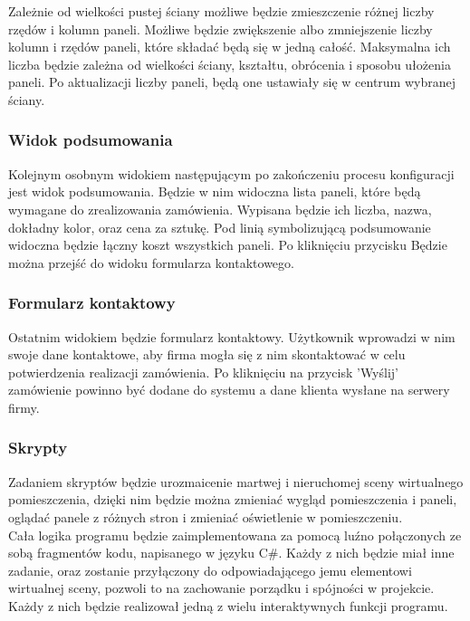 \documentclass{article} %
\begin{document}
        Zależnie od wielkości pustej ściany możliwe będzie zmieszczenie różnej liczby rzędów i kolumn paneli. Możliwe będzie zwiększenie albo zmniejszenie liczby kolumn i rzędów paneli, które składać będą się w jedną całość. Maksymalna ich liczba będzie zależna od wielkości ściany, kształtu, obrócenia i sposobu ułożenia paneli. Po aktualizacji liczby paneli, będą one ustawiały się w centrum wybranej ściany.
        \\
        
        \subsubsection*{Widok podsumowania}
        Kolejnym osobnym widokiem następującym po zakończeniu procesu konfiguracji jest widok podsumowania. Będzie w nim widoczna lista paneli, które będą wymagane do zrealizowania zamówienia. Wypisana będzie ich liczba, nazwa, dokładny kolor, oraz cena za sztukę. Pod linią symbolizującą podsumowanie widoczna będzie łączny koszt wszystkich paneli. Po kliknięciu przycisku Będzie można przejść do widoku formularza kontaktowego.
        \\
        
        \subsubsection*{Formularz kontaktowy}
        Ostatnim widokiem będzie formularz kontaktowy. Użytkownik  wprowadzi w nim swoje dane kontaktowe, aby firma mogła się z nim skontaktować w celu potwierdzenia realizacji zamówienia. Po kliknięciu na przycisk 'Wyślij' zamówienie powinno być dodane do systemu a dane klienta wysłane na serwery firmy.
        \\
        
        
        \subsubsection{Skrypty}
        Zadaniem skryptów będzie urozmaicenie martwej i nieruchomej sceny wirtualnego pomieszczenia, dzięki nim będzie można zmieniać wygląd pomieszczenia i paneli, oglądać panele z różnych stron i zmieniać oświetlenie w pomieszczeniu.
        \\
        
        Cała logika programu będzie zaimplementowana za pomocą luźno połączonych ze sobą fragmentów kodu, napisanego w języku C\#. Każdy z nich będzie miał inne zadanie, oraz zostanie przyłączony do odpowiadającego jemu elementowi wirtualnej sceny, pozwoli to na zachowanie porządku i spójności w projekcie. Każdy z nich będzie realizował jedną z wielu interaktywnych funkcji programu.
        \\
        
\end{document}
